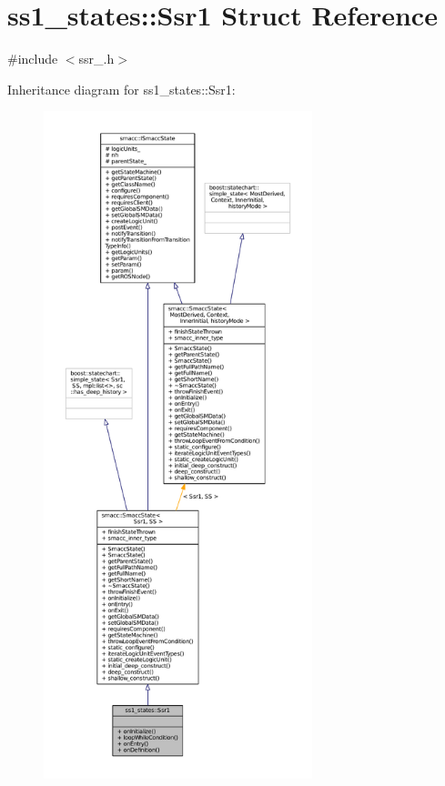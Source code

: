 \hypertarget{structss1__states_1_1Ssr1}{}\section{ss1\+\_\+states\+:\+:Ssr1 Struct Reference}
\label{structss1__states_1_1Ssr1}


{\ttfamily \#include $<$ssr\+\_.\+h$>$}



Inheritance diagram for ss1\+\_\+states\+:\+:Ssr1\+:
\nopagebreak
\begin{figure}[H]
\begin{center}
\leavevmode
\includegraphics[height=550pt]{structss1__states_1_1Ssr1__inherit__graph}
\end{center}
\end{figure}


